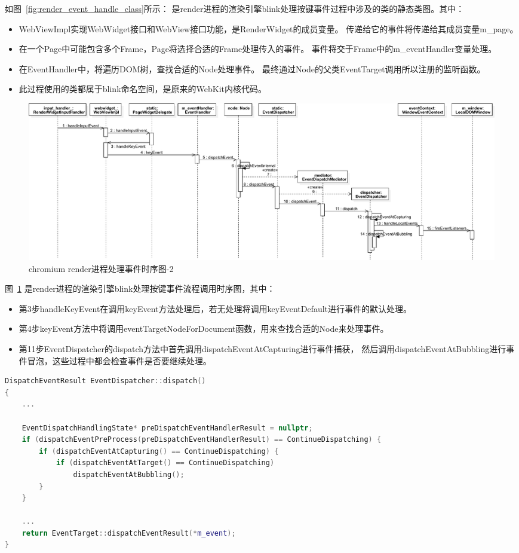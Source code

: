 如图~\ref{fig:render_event_handle_class}所示：
是render进程的渲染引擎blink处理按键事件过程中涉及的类的静态类图。其中：
\begin{itemize}
  \item WebViewImpl实现WebWidget接口和WebView接口功能，是RenderWidget的成员变量。
  传递给它的事件将传递给其成员变量m\_page。
  \item 在一个Page中可能包含多个Frame，Page将选择合适的Frame处理传入的事件。
  事件将交于Frame中的m\_eventHandler变量处理。
  \item 在EventHandler中，将遍历DOM树，查找合适的Node处理事件。
  最终通过Node的父类EventTarget调用所以注册的监听函数。
  \item 此过程使用的类都属于blink命名空间，是原来的WebKit内核代码。
\end{itemize}

\newpage
\begin{figure}[H] 
  \centering 
  \includegraphics[width=\textwidth]{image/event_study/render_event_handle_sequence.pdf} 
  \caption{chromium render进程处理事件时序图-2} \label{fig:render_event_handle_sequence} 
\end{figure}

图~\ref{fig:render_event_handle_sequence}
是render进程的渲染引擎blink处理按键事件流程调用时序图，其中：
\begin{itemize}
  \item 第3步handleKeyEvent在调用keyEvent方法处理后，若无处理将调用keyEventDefault进行事件的默认处理。
  \item 第4步keyEvent方法中将调用eventTargetNodeForDocument函数，用来查找合适的Node来处理事件。
  \item 第11步EventDispatcher的dispatch方法中首先调用dispatchEventAtCapturing进行事件捕获，
  然后调用dispatchEventAtBubbling进行事件冒泡，这些过程中都会检查事件是否要继续处理。
\end{itemize}

\begin{spacing}{1.0}
\begin{lstlisting}[language={C++}]
DispatchEventResult EventDispatcher::dispatch()
{
    ...
    
    EventDispatchHandlingState* preDispatchEventHandlerResult = nullptr;
    if (dispatchEventPreProcess(preDispatchEventHandlerResult) == ContinueDispatching) {
        if (dispatchEventAtCapturing() == ContinueDispatching) {
            if (dispatchEventAtTarget() == ContinueDispatching)
                dispatchEventAtBubbling();
        }
    }
    
    ...
    return EventTarget::dispatchEventResult(*m_event);
}
\end{lstlisting}
\end{spacing}


\ifx\withtbrowser\undefined
\else

\fi
